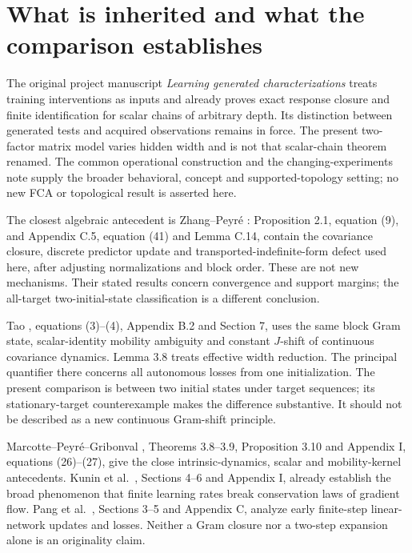 \documentclass[11pt]{article}
\theoremstyle{remark}\newtheorem{remark}[theorem]{Remark}
\begin{document}
\section{What is inherited and what the comparison establishes}
\label{sec:prior}
The original project manuscript \emph{Learning generated characterizations}
\cite{ProjectLearning} treats training interventions as inputs and already
proves exact response closure and finite identification for scalar chains
of arbitrary depth. Its distinction between generated tests and acquired
observations remains in force. The present two-factor matrix model varies
hidden width and is not that scalar-chain theorem renamed. The common
operational construction and the changing-experiments note
\cite{ProjectCommon,ProjectChanging} supply the broader behavioral,
concept and supported-topology setting; no new FCA or topological result
is asserted here.

The closest algebraic antecedent is Zhang--Peyr\'e \cite{ZP}:
Proposition 2.1, equation (9), and Appendix C.5, equation (41) and
Lemma C.14, contain the covariance closure, discrete predictor update
and transported-indefinite-form defect used here, after adjusting
normalizations and block order. These are not new mechanisms.
Their stated results concern convergence and support margins; the
all-target two-initial-state classification is a different conclusion.

Tao \cite{Tao}, equations (3)--(4), Appendix B.2 and Section 7, uses the
same block Gram state, scalar-identity mobility ambiguity and constant
$J$-shift of continuous covariance dynamics. Lemma 3.8 treats effective
width reduction. The principal quantifier there concerns all autonomous
losses from one initialization. The present comparison is between two
initial states under target sequences; its stationary-target counterexample
makes the difference substantive. It should not be described as a new
continuous Gram-shift principle.

Marcotte--Peyr\'e--Gribonval \cite{MPG}, Theorems 3.8--3.9,
Proposition 3.10 and Appendix I, equations (26)--(27), give the close
intrinsic-dynamics, scalar and mobility-kernel antecedents.
Kunin et al.\ \cite{NeuralMechanics}, Sections 4--6 and Appendix I,
already establish the broad phenomenon that finite learning rates break
conservation laws of gradient flow. Pang et al.\ \cite{Pang}, Sections
3--5 and Appendix C, analyze early finite-step linear-network updates
and losses. Neither a Gram closure nor a two-step expansion alone is an
originality claim.
\end{document}
